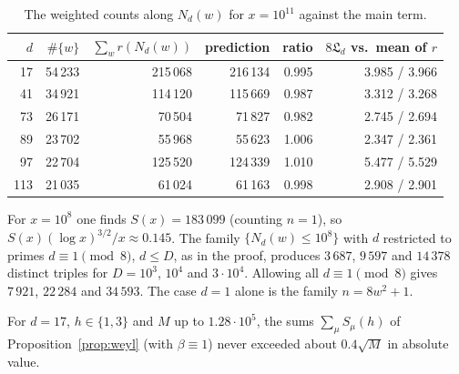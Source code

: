 \documentclass[11pt]{amsart}
\theoremstyle{remark}
\theoremstyle{definition}
\numberwithin{equation}{section}
\newcommand{\Lf}{\mathfrak{L}}
\begin{document}
\begin{table}[h]
\centering
\begin{tabular}{rrrrrr}
\toprule
$d$ & $\#\{w\}$ & $\sum_w r(N_d(w))$ & prediction & ratio & $8\Lf_d$ vs.\ mean of $r$\\
\midrule
17 & 54\,233 & 215\,068 & 216\,134 & 0.995 & 3.985 / 3.966\\
41 & 34\,921 & 114\,120 & 115\,669 & 0.987 & 3.312 / 3.268\\
73 & 26\,171 & 70\,504 & 71\,827 & 0.982 & 2.745 / 2.694\\
89 & 23\,702 & 55\,968 & 55\,623 & 1.006 & 2.347 / 2.361\\
97 & 22\,704 & 125\,520 & 124\,339 & 1.010 & 5.477 / 5.529\\
113 & 21\,035 & 61\,024 & 61\,163 & 0.998 & 2.908 / 2.901\\
\bottomrule
\end{tabular}
\caption{The weighted counts along $N_d(w)$ for $x=10^{11}$ against the main term.}
\label{tab:main}
\end{table}

For $x=10^8$ one finds $S(x)=183\,099$ (counting $n=1$), so $S(x)(\log x)^{3/2}/x\approx 0.145$. The family $\{N_d(w)\le 10^8\}$ with $d$ restricted to primes $d\equiv1\pmod 8$, $d\le D$, as in the proof, produces $3\,687$, $9\,597$ and $14\,378$ distinct triples for $D=10^3$, $10^4$ and $3\cdot10^4$. Allowing all $d\equiv1\pmod 8$ gives $7\,921$, $22\,284$ and $34\,593$. The case $d=1$ alone is the family $n=8w^2+1$.

For $d=17$, $h\in\{1,3\}$ and $M$ up to $1.28\cdot10^5$, the sums $\sum_\mu S_\mu(h)$ of Proposition~\ref{prop:weyl} (with $\beta\equiv1$) never exceeded about $0.4\sqrt M$ in absolute value.
\end{document}
